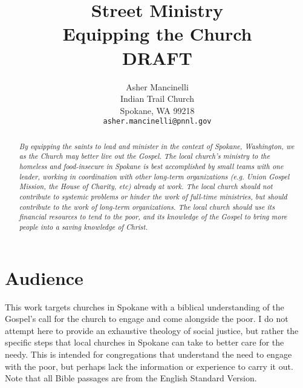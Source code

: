 \documentclass[12pt]{article}
\title{Street Ministry \\
        \large Equipping the Church \\
        \large DRAFT}
\author{Asher Mancinelli \\
        Indian Trail Church \\
        Spokane, WA 99218 \\
        \texttt{asher.mancinelli@pnnl.gov} \\ }
\begin{document}
\maketitle

\begin{abstract}
    \textit{
    By equipping the saints to lead and minister in the context of Spokane, Washington, we as the Church may better live out the Gospel.
    The local church's ministry to the homeless and food-insecure in Spokane is best accomplished by small teams with one leader, working in coordination with other long-term organizations (e.g. Union Gospel Mission, the House of Charity, etc) already at work.
    The local church should not contribute to systemic problems or hinder the work of full-time ministries, but should contribute to the work of long-term organizations.
    The local church should use its financial resources to tend to the poor, and its knowledge of the Gospel to bring more people into a saving knowledge of Christ.
    }
\end{abstract}


\clearpage

\section{Audience}

    This work targets churches in Spokane with a biblical understanding of the Gospel's call for the church to engage and come alongside the poor.
    I do not attempt here to provide an exhaustive theology of social justice, but rather the specific steps that local churches in Spokane can take to better care for the needy.
    This is intended for congregations that understand the need to engage with the poor, but perhaps lack the information or experience to carry it out.
    Note that all Bible passages are from the English Standard Version\cite{esv2016}.
\end{document}
